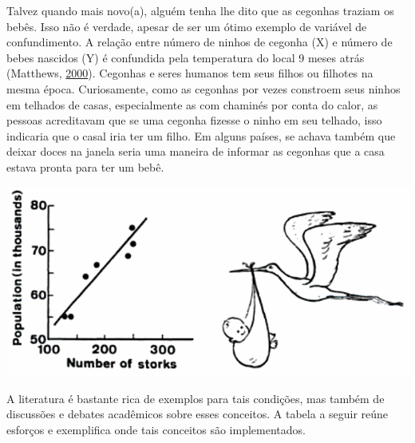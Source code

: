 \documentclass[
]{book}
\begin{document}
Talvez quando mais novo(a), alguém tenha lhe dito que as cegonhas
traziam os bebês. Isso não é verdade, apesar de ser um ótimo exemplo de
variável de confundimento. A relação entre número de ninhos de cegonha
(X) e número de bebes nascidos (Y) é confundida pela temperatura do
local 9 meses atrás (Matthews,
\protect\hyperlink{ref-Matthews2000}{2000}). Cegonhas e seres humanos
tem seus filhos ou filhotes na mesma época. Curiosamente, como as
cegonhas por vezes constroem seus ninhos em telhados de casas,
especialmente as com chaminés por conta do calor, as pessoas acreditavam
que se uma cegonha fizesse o ninho em seu telhado, isso indicaria que o
casal iria ter um filho. Em alguns países, se achava também que deixar
doces na janela seria uma maneira de informar as cegonhas que a casa
estava pronta para ter um bebê.

\includegraphics{./img/cap_cegonha.png}

A literatura é bastante rica de exemplos para tais condições, mas também
de discussões e debates acadêmicos sobre esses conceitos. A tabela a
seguir reúne esforços e exemplifica onde tais conceitos são
implementados.
\end{document}

